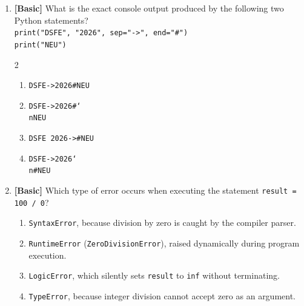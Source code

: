 \documentclass[11pt,a4paper]{article}
\begin{document}
\begin{enumerate}[label=\textbf{Q\arabic*.},leftmargin=1.8em,itemsep=0.6pt,topsep=0.2pt]
\item \textbf{[Basic]} What is the exact console output produced by the following two Python statements?\\
\texttt{print("DSFE", "2026", sep="->", end="\#")}\\
\texttt{print("NEU")}
\begin{multicols}{2}
\begin{enumerate}[label=\Alph*.]
  \item \texttt{DSFE->2026\#NEU}
  \item \texttt{DSFE->2026\#\char`\\nNEU}
  \item \texttt{DSFE 2026->\#NEU}
  \item \texttt{DSFE->2026\char`\\n\#NEU}
\end{enumerate}
\end{multicols}

\item \textbf{[Basic]} Which type of error occurs when executing the statement \texttt{result = 100 / 0}?
\begin{enumerate}[label=\Alph*.,leftmargin=1.8em]
  \item \texttt{SyntaxError}, because division by zero is caught by the compiler parser.
  \item \texttt{RuntimeError} (\texttt{ZeroDivisionError}), raised dynamically during program execution.
  \item \texttt{LogicError}, which silently sets \texttt{result} to \texttt{inf} without terminating.
  \item \texttt{TypeError}, because integer division cannot accept zero as an argument.
\end{enumerate}

\end{enumerate}

\newpage

\end{document}

